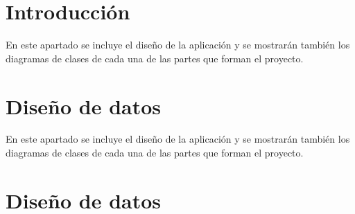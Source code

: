 \section{Introducción}\label{introducciondiseno}
En este apartado se incluye el diseño de la aplicación y se mostrarán también los diagramas de clases de cada una de las partes que forman el proyecto.

\section{Diseño de datos}\label{datos}

En este apartado se incluye el diseño de la aplicación y se mostrarán también los diagramas de clases de cada una de las partes que forman el proyecto.


\begin{landscape}

  \end{landscape}

\section{Diseño de datos}\label{datos}